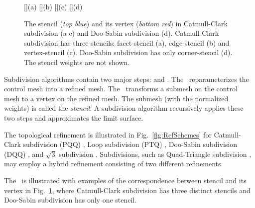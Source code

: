 
\begin{figure}[tb]
  \centering
  []{(a)}
  []{(b)}
  []{(c)}
  []{(d)}
  \caption{The stencil ({\itshape top blue}) and its 
           vertex ({\itshape bottom red}) in 
	   Catmull-Clark subdivision (a-c)
           and Doo-Sabin subdivision (d). Catmull-Clark
           subdivision has three stencils: facet-stencil (a), 
           edge-stencil (b) and vertex-stencil (c). 
           Doo-Sabin subdivision has only corner-stencil (d).
	   The stencil weights are not shown.}
  \label{fig:RefMap}\vspace*{-4mm}
\end{figure}



Subdivision algorithms \cite{Warren:subdivision, Sub:course:2000} 
contain two major steps: \emph{\tr} and \emph{\gm}.
The \tr\ reparameterizes the control mesh into a refined 
mesh. The \gm\ transforms a submesh on the control mesh
to a vertex on the refined mesh. The submesh (with
the normalized weights) is called the
\emph{stencil}. A subdivision algorithm recursively 
applies these two steps and approximates the limit surface. 

The topological refinement is illustrated 
in Fig.~\ref{fig:RefSchemes} for Catmull-Clark
subdivision (PQQ) \cite{cc}, Loop subdivision (PTQ) \cite{loop},
Doo-Sabin subdivision (DQQ) \cite{ds}, and $\sqrt{3}$ subdivision
\cite{sqrt3}. Subdivisions, such as Quad-Triangle subdivision 
\cite{qts,l-pg-03}, may employ a hybrid refinement consisting
of two different refinements.

The \gm\ is illustrated with examples of the correspondence between
stencil and its vertex in Fig.~\ref{fig:RefMap}, where Catmull-Clark
subdivision has three distinct stencils and Doo-Sabin subdivision has
only one stencil. 

